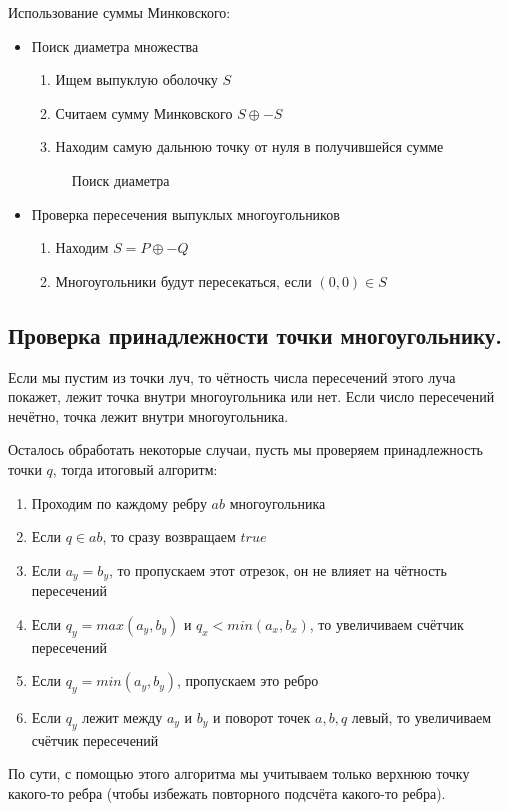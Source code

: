 Использование суммы Минковского:
\begin{itemize}
  \item Поиск диаметра множества
    \begin{enumerate}
      \item Ищем выпуклую оболочку $S$
      \item Считаем сумму Минковского $S \oplus -S$
      \item Находим самую дальнюю точку от нуля в получившейся сумме
    \end{enumerate}
    \begin{figure}[ht]
        \centering
        \caption*{Поиск диаметра}
        \label{fig:mink}
    \end{figure}
  \item Проверка пересечения выпуклых многоугольников
    \begin{enumerate}
      \item Находим $S = P \oplus -Q$
      \item Многоугольники будут пересекаться, если $(0, 0) \in S$
    \end{enumerate}
\end{itemize}

\subsection{Проверка принадлежности точки многоугольнику.}
Если мы пустим из точки луч, то чётность числа пересечений этого луча покажет, лежит точка внутри
многоугольника или нет. Если число пересечений нечётно, точка лежит внутри многоугольника.

Осталось обработать некоторые случаи, пусть мы проверяем принадлежность точки $q$, тогда итоговый алгоритм:
\begin{enumerate}
  \item Проходим по каждому ребру $ab$ многоугольника
  \item Если $q \in ab$, то сразу возвращаем $true$
  \item Если $a_{y} = b_{y}$, то пропускаем этот отрезок, он не влияет на чётность пересечений
  \item Если $q_{y} = max(a_{y}, b_{y})$ и $q_{x} < min(a_{x}, b_{x})$, то увеличиваем счётчик пересечений
  \item Если $q_{y} = min(a_{y}, b_{y})$, пропускаем это ребро
  \item Если $q_{y}$ лежит между $a_{y}$ и $b_{y}$ и поворот точек $a, b, q$ левый, то увеличиваем счётчик
    пересечений
\end{enumerate}
По сути, с помощью этого алгоритма мы учитываем только верхнюю точку какого-то ребра (чтобы избежать
повторного подсчёта какого-то ребра).

